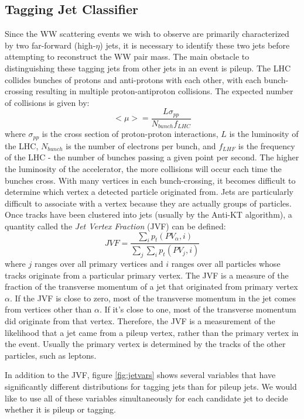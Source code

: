 \documentclass[10pt]{ucscthesisbs}
\begin{document}
\subsection{Tagging Jet Classifier}
Since the WW scattering events we wish to observe are primarily characterized by two far-forward (high-$\eta$) jets, it is necessary to identify these two jets before attempting to reconstruct the WW pair mass. The main obstacle to distinguishing these tagging jets from other jets in an event is pileup. The LHC collides bunches of protons and anti-protons with each other, with each bunch-crossing resulting in multiple proton-antiproton collisions. The expected number of collisions is given by: \cite{ATLASJVF}
\begin{equation}
<\mu> = \frac{L\sigma_{pp}}{N_{bunch}f_{LHC}} 
\end{equation}
where $\sigma_{pp}$ is the cross section of proton-proton interactions, $L$ is the luminosity of the LHC, $N_{bunch}$ is the number of electrons per bunch, and $f_{LHF}$ is the frequency of the LHC - the number of bunches passing a given point per second.
The higher the luminosity of the accelerator, the more collisions will occur each time the bunches cross. With many vertices in each bunch-crossing, it becomes difficult to determine which vertex a detected particle originated from. Jets are particularly difficult to associate with a vertex because they are actually groups of particles. Once tracks have been clustered into jets (usually by the Anti-KT algorithm), a quantity called the \textit{Jet Vertex Fraction} (JVF) can be defined:
\begin{equation}
JVF = \frac{\sum_{i}{p_t(PV_\alpha, i)}}{\sum_{j}\sum_{i}{p_t(PV_j, i)}}
\end{equation}
where $j$ ranges over all primary vertices and $i$ ranges over all particles whose tracks originate from a particular primary vertex. The JVF is a measure of the fraction of the transverse momentum of a jet that originated from primary vertex $\alpha$. If the JVF is close to zero, most of the transverse momentum in the jet comes from vertices other than $\alpha$. If it's close to one, most of the transverse momentum did originate from that vertex. Therefore, the JVF is a measurement of the likelihood that a jet came from a pileup vertex, rather than the primary vertex in the event. Usually the primary vertex is determined by the tracks of the other particles, such as leptons.

In addition to the JVF, figure \ref{fig:jetvars} shows several variables that have significantly different distributions for tagging jets than for pileup jets. We would like to use all of these variables simultaneously for each candidate jet to decide whether it is pileup or tagging.
\end{document}
